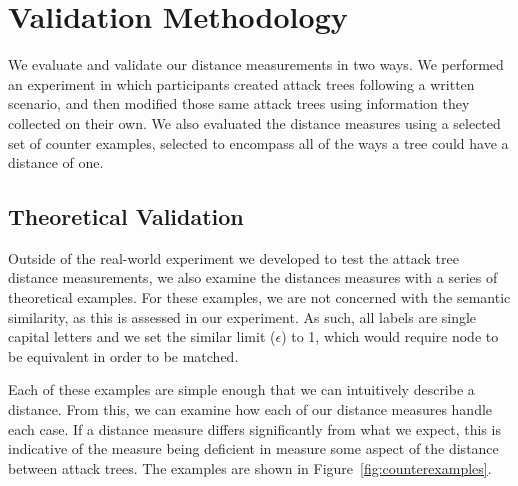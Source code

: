 \section{Validation Methodology}
\label{sec:methodology}

We evaluate and validate our distance measurements in two ways. We performed an experiment in which participants created attack trees following a written scenario, and then modified those same attack trees using information they collected on their own. We also evaluated the distance measures using a selected set of counter examples, selected to encompass all of the ways a tree could have a distance of one.





\subsection{Theoretical Validation}
\label{ssec:methodology-examples}


Outside of the real-world experiment we developed to test the attack tree distance measurements, we also examine the distances measures with a series of theoretical examples. For these examples, we are not concerned with the semantic similarity,  as this is assessed in our experiment. As such, all labels are single capital letters and we set the similar limit ($\epsilon$) to 1, which would require node to be equivalent in order to be matched.

Each of these examples are simple enough that we can intuitively describe a distance. From this, we can examine how each of our distance measures handle each case. If a distance measure differs significantly from what we expect, this is indicative of the measure being deficient in measure some aspect of the distance between attack trees. The examples are shown in Figure~\ref{fig:counterexamples}.


